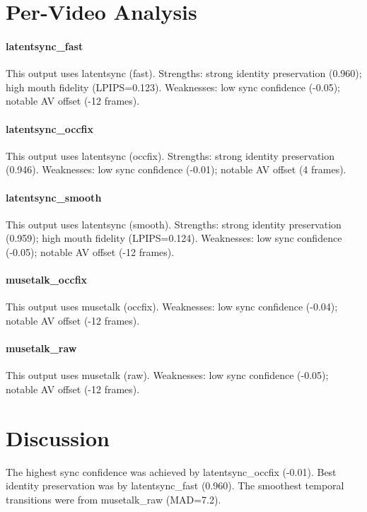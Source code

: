 \documentclass[11pt,a4paper]{article}
\begin{document}
\section{Per-Video Analysis}

\paragraph{latentsync\_fast}
This output uses latentsync (fast).
Strengths: strong identity preservation (0.960); high mouth fidelity (LPIPS=0.123). Weaknesses: low sync confidence (-0.05); notable AV offset (-12 frames). 

\paragraph{latentsync\_occfix}
This output uses latentsync (occfix).
Strengths: strong identity preservation (0.946). Weaknesses: low sync confidence (-0.01); notable AV offset (4 frames). 

\paragraph{latentsync\_smooth}
This output uses latentsync (smooth).
Strengths: strong identity preservation (0.959); high mouth fidelity (LPIPS=0.124). Weaknesses: low sync confidence (-0.05); notable AV offset (-12 frames). 

\paragraph{musetalk\_occfix}
This output uses musetalk (occfix).
Weaknesses: low sync confidence (-0.04); notable AV offset (-12 frames). 

\paragraph{musetalk\_raw}
This output uses musetalk (raw).
Weaknesses: low sync confidence (-0.05); notable AV offset (-12 frames). 

\section{Discussion}

The highest sync confidence was achieved by latentsync\_occfix (-0.01). Best identity preservation was by latentsync\_fast (0.960). The smoothest temporal transitions were from musetalk\_raw (MAD=7.2). 
\end{document}
